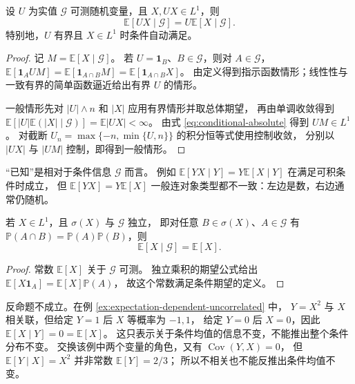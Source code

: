\documentclass[UTF8,12pt,a4paper,fontset=fandol]{ctexart}
\begin{document}
\begin{proposition}[提出已知的量]
\label{prop:conditional-pullout}
设 $U$ 为实值 $\mathcal G$ 可测随机变量，且 $X,UX\in L^1$，则
\begin{equation}
  \mathbb E[UX\mid\mathcal G]
  =U\mathbb E[X\mid\mathcal G].
  \label{eq:conditional-pullout}
\end{equation}
特别地，$U$ 有界且 $X\in L^1$ 时条件自动满足。
\end{proposition}

\begin{proof}
记 $M=\mathbb E[X\mid\mathcal G]$。
若 $U=\mathbf1_B$、$B\in\mathcal G$，则对 $A\in\mathcal G$，
$\mathbb E[\mathbf1_AUM]=\mathbb E[\mathbf1_{A\cap B}M]
=\mathbb E[\mathbf1_{A\cap B}X]$。
由定义得到指示函数情形；线性性与一致有界的简单函数逼近给出有界 $U$ 的情形。

一般情形先对 $|U|\wedge n$ 和 $|X|$ 应用有界情形并取总体期望，
再由单调收敛得到
$\mathbb E[|U|\mathbb E(|X|\mid\mathcal G)]=\mathbb E|UX|<\infty$。
由式 \eqref{eq:conditional-absolute} 得到 $UM\in L^1$。
对截断 $U_n=\max\{-n,\min\{U,n\}\}$ 的积分恒等式使用控制收敛，
分别以 $|UX|$ 与 $|UM|$ 控制，即得到一般情形。
\end{proof}

“已知”是相对于条件信息 $\mathcal G$ 而言。
例如 $\mathbb E[Y X\mid Y]=Y\mathbb E[X\mid Y]$ 在满足可积条件时成立，
但 $\mathbb E[YX]=Y\mathbb E[X]$ 一般连对象类型都不一致：左边是数，右边通常仍随机。

\begin{proposition}[独立信息不改变均值]
\label{prop:conditional-independence}
若 $X\in L^1$，且 $\sigma(X)$ 与 $\mathcal G$ 独立，
即对任意 $B\in\sigma(X)$、$A\in\mathcal G$ 有
$\mathbb P(A\cap B)=\mathbb P(A)\mathbb P(B)$，则
\[
  \mathbb E[X\mid\mathcal G]=\mathbb E[X].
\]
\end{proposition}

\begin{proof}
常数 $\mathbb E[X]$ 关于 $\mathcal G$ 可测。
独立乘积的期望公式给出
$\mathbb E[X\mathbf1_A]=\mathbb E[X]\mathbb P(A)$，
故这个常数满足条件期望的定义。
\end{proof}

反命题不成立。在例 \ref{ex:expectation-dependent-uncorrelated} 中，
$Y=X^2$ 与 $X$ 相关联，但给定 $Y=1$ 后 $X$ 等概率为 $-1,1$，
给定 $Y=0$ 后 $X=0$，因此
$\mathbb E[X\mid Y]=0=\mathbb E[X]$。
这只表示关于条件均值的信息不变，不能推出整个条件分布不变。
交换该例中两个变量的角色，又有 $\operatorname{Cov}(Y,X)=0$，
但 $\mathbb E[Y\mid X]=X^2$ 并非常数 $\mathbb E[Y]=2/3$；
所以不相关也不能反推出条件均值不变。
\end{document}
